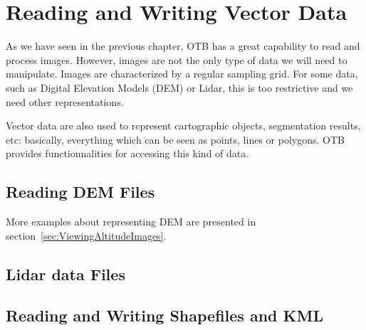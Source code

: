 \chapter{Reading and Writing Vector Data}
\label{sec:ReadingVectorData}

As we have seen in the previous chapter, OTB has a great capability to
read and process images. However, images are not the only type of data
we will need to manipulate. Images are characterized by a regular
sampling grid. For some data, such as Digital Elevation Models (DEM)
or Lidar, this is too restrictive and we need other representations.

Vector data are also used to represent cartographic objects,
segmentation results, etc: basically, everything which can be seen as
points, lines or polygons. OTB provides functionnalities for accessing
this kind of data.

\section{Reading DEM Files}
\label{sec:ReadDEM}


More examples about representing DEM are presented in section~\ref{sec:ViewingAltitudeImages}.

\section{Lidar data Files}
\label{sec:ReadLidar}



\section{Reading and Writing Shapefiles and KML}
\label{sec:ReadVectorData}


% 
